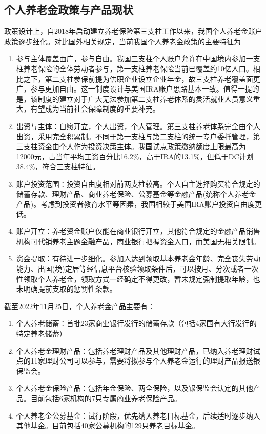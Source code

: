 \documentclass[a4paper,zihao=5]{ctexart}
\begin{document}
\subsection{个人养老金政策与产品现状}
政策设计上，自2018年启动建立养老保险第三支柱工作以来，我国个人养老金账户政策逐步细化。对比国外相关规定，当前我国个人养老金政策的主要特征为
\begin{enumerate}
    \item 参与主体覆盖面广，参与自由。我国三支柱个人账户允许在中国境内参加一支柱养老保险的全体劳动者参与，第一支柱养老保险当前已覆盖约10亿人口。相比之下，第二支柱参保前提为供职企业设立企业年金，故三支柱养老覆盖面更广，参与更加自由。这一制度设计与美国IRA账户思路基本一致。值得一提的是，该制度的建立对于广大无法参加第二支柱养老体系的灵活就业人员意义重大，有望成为当前社会保障制度的重要补充。
    \item 出资与主体：自愿开立，个人出资，个人管理。第三支柱养老体系完全由个人出资，采用完全积累制。不同于第一支柱与第二支柱的统一专户委托管理，第三支柱资金由个人作为投资决策主体。我国试点政策缴纳额度上限最高为12000元，占当年平均工资百分比16.2\%，高于IRA的13.1\%，但低于DC计划38.4\%，符合三支柱特征。
    \item 账户投资范围：投资自由度相对前两支柱较高。个人自主选择购买符合规定的储蓄存款、理财产品、商业养老保险、公募基金等金融产品(统称个人养老金产品)。考虑到投资者教育水平等因素，我国相较于美国IRA账户投资自由度更低。
    \item 账户开立：养老资金账户仅能在商业银行开立，其他符合规定的金融产品销售机构可代销养老主题金融产品，商业银行把握资金入口，而美国无相关限制。
    \item 资金提取：有待进一步细化。参加人达到领取基本养老金年龄、完全丧失劳动能力、出国(境)定居等经信息平台核验领取条件后，可以按月、分次或者一次性领取个人养老金，领取方式一经确定不得更改，暂未规定强制提取年龄，也未明确提前支取的惩罚性条款。
\end{enumerate}

截至2022年11月25日，个人养老金产品主要有：
\begin{enumerate}
    \item 个人养老储蓄：首批23家商业银行发行的储蓄存款（包括4家国有大行发行的特定养老储蓄）
    \item 个人养老金理财产品：包括养老理财产品及其他理财产品，已纳入养老理财试点的11家理财公司可以参与，需要将拟参与个人养老金运行的理财产品报送银保监会。
    \item 个人养老金保险产品：包括年金保险、两全保险，以及银保监会认定的其他产品。目前包括6家机构的7只专属商业养老保险产品。
    \item 个人养老金公募基金：试行阶段，优先纳入养老目标基金，后续适时逐步纳入其他基金。目前包括40家公募机构的129只养老目标基金。
\end{enumerate}
\end{document}
